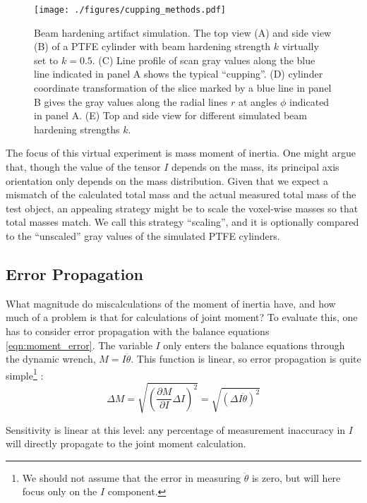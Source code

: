 \begin{figure}[htbp]
\centering
\texttt{[image: ./figures/cupping\_methods.pdf]}
\caption{\label{fig:cupping_methods}Beam hardening artifact simulation. The top view (A) and side view (B) of a PTFE cylinder with beam hardening strength \(k\) virtually set to \(k=0.5\). (C) Line profile of scan gray values along the blue line indicated in panel A shows the typical ``cupping''. (D) cylinder coordinate transformation of the slice marked by a blue line in panel B gives the gray values along the radial lines \(r\) at angles \(\phi\) indicated in panel A. (E) Top and side view for different simulated beam hardening strengths \(k\).}
\end{figure}


The focus of this virtual experiment is mass moment of inertia.
One might argue that, though the value of the tensor \(I\) depends on the mass, its principal axis orientation only depends on the mass distribution.
Given that we expect a mismatch of the calculated total mass and the actual measured total mass of the test object, an appealing strategy might be to scale the voxel-wise masses so that total masses match.
We call this strategy ``scaling'', and it is optionally compared to the ``unscaled'' gray values of the simulated PTFE cylinders.



\subsection{Error Propagation}
\label{sec:orgae14f30}
What magnitude do miscalculations of the moment of inertia have, and how much of a problem is that for calculations of joint moment?
To evaluate this, one has to consider error propagation with the balance equations \eqref{eqn:moment_error}.
The variable \(I\) only enters the balance equations through the dynamic wrench, \(M = I \ddot\theta\).
This function is linear, so error propagation is quite simple\footnote{We should not assume that the error in measuring \(\ddot \theta\) is zero, but will here focus only on the \(I\) component.} \citep{Hughes2010,Normann2016}:
\begin{equation}\label{eqn:moment_error}
\Delta M = \sqrt{\left(\frac{\partial M}{\partial I}\Delta I\right)^2} = \sqrt{\left(\Delta I \ddot\theta\right)^2}
\end{equation}

Sensitivity is linear at this level: any percentage of measurement inaccuracy in \(I\) will directly propagate to the joint moment calculation.


